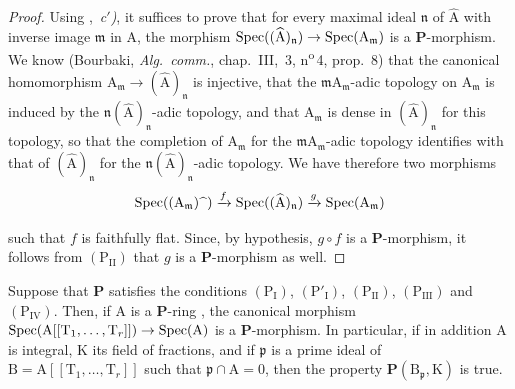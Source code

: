 \begin{proof}
Using ,~\emph{c$'$)}, it suffices to prove that for every maximal ideal $\mathfrak{n}$ of $\widehat{\mathrm{A}}$ with inverse image $\mathfrak{m}$ in $\mathrm{A}$, the morphism $\operatorname{Spec}((\widehat{\mathrm{A}})_\mathfrak{n})\to\operatorname{Spec}(\mathrm{A}_\mathfrak{m})$ is a $\boldsymbol{P}$-morphism.
We know (Bourbaki, \emph{Alg.\ comm.}, chap.~III, \textsection\,3, n\textsuperscript{o}\,4, prop.~8) that the canonical homomorphism $\mathrm{A}_\mathfrak{m}\to(\widehat{\mathrm{A}})_\mathfrak{n}$ is injective, that the $\mathfrak{m}\mathrm{A}_\mathfrak{m}$-adic topology on $\mathrm{A}_\mathfrak{m}$ is induced by the $\mathfrak{n}(\widehat{\mathrm{A}})_\mathfrak{n}$-adic topology, and that $\mathrm{A}_\mathfrak{m}$ is dense in $(\widehat{\mathrm{A}})_\mathfrak{n}$ for this topology, so that the completion of $\mathrm{A}_\mathfrak{m}$ for the $\mathfrak{m}\mathrm{A}_\mathfrak{m}$-adic topology identifies with that of $(\widehat{\mathrm{A}})_\mathfrak{n}$ for the $\mathfrak{n}(\widehat{\mathrm{A}})_\mathfrak{n}$-adic topology.
We have therefore two morphisms
\[
  \operatorname{Spec}((\mathrm{A}_\mathfrak{m})\widehat{\phantom{x}})\xrightarrow{f}\operatorname{Spec}((\widehat{\mathrm{A}})_\mathfrak{n})\xrightarrow{g}\operatorname{Spec}(\mathrm{A}_\mathfrak{m})
\]


such that $f$ is faithfully flat. Since, by hypothesis, $g\circ f$ is a $\boldsymbol{P}$-morphism, it follows from $(\mathrm{P_{II}})$ that $g$ is a $\boldsymbol{P}$-morphism as well.
\end{proof}

\begin{corollary}[7.4.7]
\label{IV.7.4.7}
Suppose that $\boldsymbol{P}$ satisfies the conditions $(\mathrm{P_I})$, $(\mathrm{P}'_\mathrm{I})$, $(\mathrm{P_{II}})$, $(\mathrm{P_{III}})$ and $(\mathrm{P_{IV}})$.
Then, if $\mathrm{A}$ is a $\boldsymbol{P}$-ring , the canonical morphism $\operatorname{Spec}(\mathrm{A}[[\mathrm{T}_1,\ldots,\mathrm{T}_r]])\to\operatorname{Spec}(\mathrm{A})$ is a $\boldsymbol{P}$-morphism.
In particular, if in addition $\mathrm{A}$ is integral, $\mathrm{K}$ its field of fractions, and if $\mathfrak{p}$ is a prime ideal of $\mathrm{B}=\mathrm{A}[[\mathrm{T}_1,\ldots,\mathrm{T}_r]]$ such that $\mathfrak{p}\cap\mathrm{A}=0$, then the property $\boldsymbol{P}(\mathrm{B}_\mathfrak{p},\mathrm{K})$ is true.
\end{corollary}

